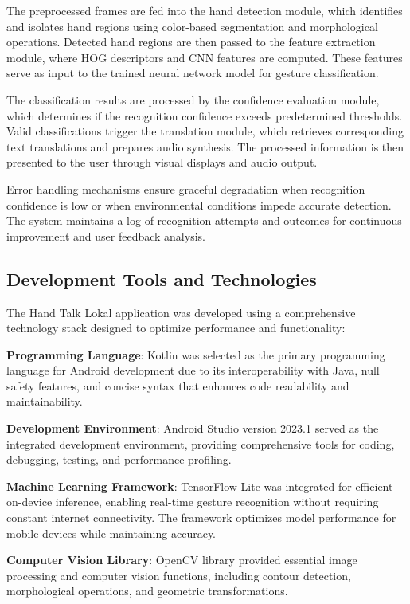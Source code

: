 \documentclass[12pt]{article}
\begin{document}
The preprocessed frames are fed into the hand detection module, which identifies and isolates hand regions using color-based segmentation and morphological operations. Detected hand regions are then passed to the feature extraction module, where HOG descriptors and CNN features are computed. These features serve as input to the trained neural network model for gesture classification.

The classification results are processed by the confidence evaluation module, which determines if the recognition confidence exceeds predetermined thresholds. Valid classifications trigger the translation module, which retrieves corresponding text translations and prepares audio synthesis. The processed information is then presented to the user through visual displays and audio output.

Error handling mechanisms ensure graceful degradation when recognition confidence is low or when environmental conditions impede accurate detection. The system maintains a log of recognition attempts and outcomes for continuous improvement and user feedback analysis.

\subsection{Development Tools and Technologies}

The Hand Talk Lokal application was developed using a comprehensive technology stack designed to optimize performance and functionality:

\textbf{Programming Language}: Kotlin was selected as the primary programming language for Android development due to its interoperability with Java, null safety features, and concise syntax that enhances code readability and maintainability.

\textbf{Development Environment}: Android Studio version 2023.1 served as the integrated development environment, providing comprehensive tools for coding, debugging, testing, and performance profiling.

\textbf{Machine Learning Framework}: TensorFlow Lite was integrated for efficient on-device inference, enabling real-time gesture recognition without requiring constant internet connectivity. The framework optimizes model performance for mobile devices while maintaining accuracy.

\textbf{Computer Vision Library}: OpenCV library provided essential image processing and computer vision functions, including contour detection, morphological operations, and geometric transformations.
\end{document}
